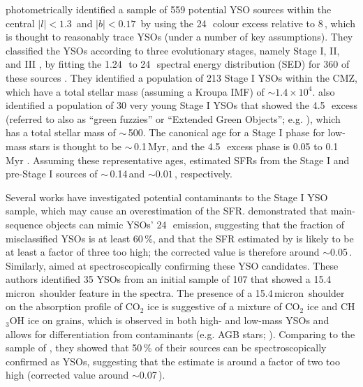 \citet{Yusef-Zadeh2009} photometrically identified a sample of 559 potential YSO sources within the central $|l|<1.3$\degree\ and $|b|<0.17$\degree\ by using the 24\,\micron\ colour excess relative to 8\,\micron, which is thought to reasonably trace YSOs (under a number of key assumptions). They classified the YSOs according to three evolutionary stages, namely Stage I, II, and III \citep{Robitaille2006}, by fitting the 1.24\,\micron\ to 24\,\micron\ spectral energy distribution (SED) for 360 of these sources \citep{Robitaille2006,Robitaille2007}. 
They identified a population of 213 Stage I YSOs within the CMZ, which have a total stellar mass (assuming a Kroupa IMF) of $\sim1.4\times10^{4}$\msun.
\citet{Yusef-Zadeh2009} also identified a population of 30 very young Stage I YSOs that showed the 4.5\,\micron\ excess (referred to also as ``green fuzzies'' or ``Extended Green Objects''; e.g. \citealp{Cyganowski2008,Chambers2009}), which has a total stellar mass of $\sim$\,500\msun.
The canonical age for a Stage I phase for low-mass stars is thought to be $\sim$\,0.1\,Myr, and the 4.5\,\micron\ excess phase is 0.05 to 0.1\,Myr \citep{Evans2009}. 
Assuming these representative ages, \citet{Yusef-Zadeh2009} estimated SFRs from the Stage I and pre-Stage I sources of $\sim$\,0.14\,\msunyr and $\sim0.01$\,\msunyr, respectively. 



Several works have investigated potential contaminants to the \citet{Yusef-Zadeh2009} Stage I YSO sample, which may cause an overestimation of the SFR. \citet{Koepferl2015} demonstrated that main-sequence objects can mimic YSOs' 24\,\micron\ emission, suggesting that the fraction of misclassified YSOs is at least 60\,\%, and that the SFR estimated by \citet{Yusef-Zadeh2009} is likely to be at least a factor of three too high; the corrected value is therefore around $\sim$0.05\,\msunyr. Similarly, \citet{An2011} aimed at spectroscopically confirming these YSO candidates. These authors identified 35 YSOs from an initial sample of 107 that showed a 15.4\,micron\ shoulder feature in the spectra. The presence of a 15.4\,micron\ shoulder on the absorption profile of CO$_2$ ice is suggestive of a mixture of CO$_2$ ice and CH$_3$OH ice on grains, which is observed in both high- and low-mass YSOs and allows for differentiation from contaminants (e.g. AGB stars; \citealp{An2009}). Comparing to the sample of \citet{Yusef-Zadeh2009}, they showed that 50\,\% of their sources can be spectroscopically confirmed as YSOs, suggesting that the \citet{Yusef-Zadeh2009} estimate is around a factor of two too high (corrected value around $\sim$0.07\,\msunyr).

